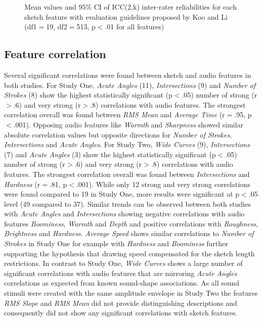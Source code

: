 \documentclass[]{interact}
\theoremstyle{plain}%
\theoremstyle{definition}
\theoremstyle{remark}
\begin{document}
\begin{figure}[!ht]
    \hfill
    \caption{Mean values and 95\% CI of ICC(2,k) inter-rater reliabilities for each sketch feature with evaluation guidelines proposed by Koo and Li (df1$=$19, df2$=$513, p$<$.01 for all features)} 
    \label{fig:icc}
  \end{figure}

\subsection{Feature correlation}\label{subsec:feature_correlation}
Several significant correlations were found between sketch and audio features in both studies.  For Study One, \textit{Acute Angles} (11), \textit{Intersections} (9) and \textit{Number of Strokes} (8) show the highest statistically significant (p$<$.05) number of strong (r$>$.6) and very strong (r$>$.8) correlations with audio features. The strongest correlation overall was found between \textit{RMS Mean} and \textit{Average Time} (r$=$.95, p$<$.001). Opposing audio features like \textit{Warmth} and \textit{Sharpness} showed similar absolute correlation values but opposite directions for \textit{Number of Strokes}, \textit{Intersections} and \textit{Acute Angles}. For Study Two, \textit{Wide Curves} (9), \textit{Intersections} (7) and \textit{Acute Angles} (3) show the highest statistically significant (p$<$.05) number of strong (r$>$.6) and very strong (r$>$.8) correlations with audio features. The strongest correlation overall was found between \textit{Intersections} and \textit{Hardness} (r$=$.81, p$<$.001). While only 12 strong and very strong correlations were found compared to 19 in Study One, more results were significant at p$<$.05 level (49 compared to 37). Similar trends can be observed between both studies with \textit{Acute Angles} and \textit{Intersections} showing negative correlations with audio features \textit{Boominess}, \textit{Warmth} and \textit{Depth} and positive correlations with \textit{Roughness}, \textit{Brightness} and \textit{Hardness}. \textit{Average Speed} shows similar correlations to \textit{Number of Strokes} in Study One for example with \textit{Hardness} and \textit{Boominess} further supporting the hypothesis that drawing speed compensated for the sketch length restrictions. In contrast to Study One, \textit{Wide Curves} shows a large number of significant correlations with audio features that are mirroring \textit{Acute Angles} correlations as expected from known sound-shape associations. As all sound stimuli were created with the same amplitude envelope in Study Two the features \textit{RMS Slope} and \textit{RMS Mean} did not provide distinguishing descriptions and consequently did not show any significant correlations with sketch features. 
 
\end{document}
